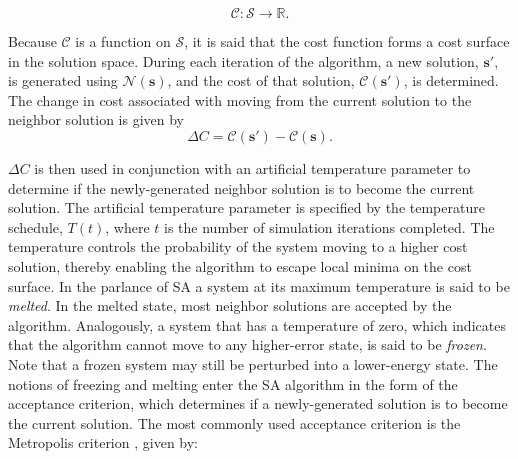 \documentclass[11pt]{afthesis}
\begin{document}
	\begin{equation*} \label{eq:cost_mapping}
	\mathcal{C} : \boldsymbol{\mathcal{S}} \rightarrow \mathbb{R}.
	\end{equation*}
	
	\noindent Because \begin{math} \mathcal{C} \end{math} is a function on \begin{math} \boldsymbol{\mathcal{S}} \end{math}, it is said that the cost function forms a cost surface in the solution space. During each iteration of the algorithm, a new solution, \begin{math}\boldsymbol{s}'  \end{math}, is generated using \begin{math}\boldsymbol{\mathcal{N}(\boldsymbol{s})} \end{math}, and the cost of that solution, \begin{math}\mathcal{C}(\boldsymbol{s}' ) \end{math}, is determined. The change in cost associated with moving from the current solution to the neighbor solution is given by 
	\begin{equation*} \label{eq:delta_cost}
	\Delta C =  \mathcal{C}(\boldsymbol{s}')-\mathcal{C}(\boldsymbol{s}).
	\end{equation*}
	
	\begin{math}\Delta C \end{math} is then used in conjunction with an artificial temperature parameter to determine if the newly-generated neighbor solution is to become the current solution. The artificial temperature parameter is specified by the temperature schedule, \begin{math}T(t)\end{math}, where \begin{math}t\end{math} is the number of simulation iterations completed. The temperature controls the probability of the system moving to a higher cost solution, thereby enabling the algorithm to escape local minima on the cost surface. In the parlance of SA \cite{kirkpatrick1983} a system at its maximum temperature is said to be \textit{melted}. In the melted state, most neighbor solutions are accepted by the algorithm. Analogously, a system that has a temperature of zero, which indicates that the algorithm cannot move to any higher-error state, is said to be \textit{frozen}. Note that a frozen system may still be perturbed into a lower-energy state. The notions of freezing and melting enter the SA algorithm in the form of the acceptance criterion, which determines if a newly-generated solution is to become the current solution. The most commonly used acceptance criterion is the Metropolis criterion \cite{metropolis1953}, given by:
	
\end{document}
